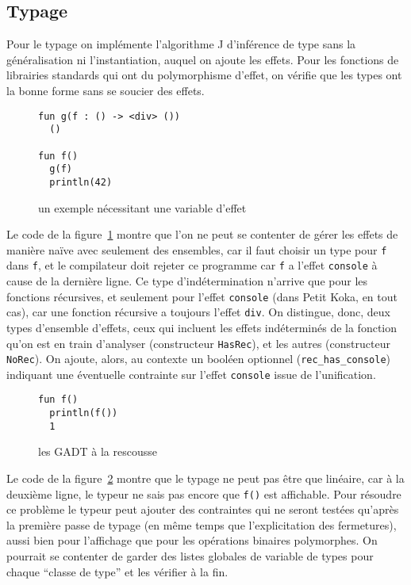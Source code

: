 \documentclass[11pt]{article}
\begin{document}
\subsection{Typage}
Pour le typage on implémente l'algorithme J d'inférence de type sans la
généralisation ni l'instantiation, auquel on ajoute les effets. Pour les
fonctions de librairies standards qui ont du polymorphisme d'effet, on vérifie
que les types ont la bonne forme sans se soucier des effets.

\begin{figure}[h]\label{code2}
\begin{verbatim}
fun g(f : () -> <div> ())
  ()

fun f()
  g(f)
  println(42)
\end{verbatim}
\caption{un exemple nécessitant une variable d'effet}
\end{figure}

Le code de la figure~\ref{code2} montre que l'on ne peut se contenter de gérer
les effets de manière naïve avec seulement des ensembles, car il faut choisir un
type pour \texttt{f} dans \texttt{f}, et le compilateur doit rejeter ce
programme car \texttt{f} a l'effet \texttt{console} à cause de la dernière
ligne. Ce type d'indétermination n'arrive que pour les fonctions récursives, et
seulement pour l'effet \texttt{console} (dans \textsf{Petit Koka}, en tout cas),
car une fonction récursive a toujours l'effet \texttt{div}. On distingue, donc,
deux types d'ensemble d'effets, ceux qui incluent les effets indéterminés de la
fonction qu'on est en train d'analyser (constructeur \texttt{HasRec}), et les
autres (constructeur \texttt{NoRec}). On ajoute, alors, au contexte un booléen
optionnel (\texttt{rec\_has\_console}) indiquant une éventuelle contrainte sur
l'effet \texttt{console} issue de l'unification.

\begin{figure}[h]\label{code1}
\begin{verbatim}
fun f()
  println(f())
  1
\end{verbatim}
\caption{les GADT à la rescousse}
\end{figure}

Le code de la figure~\ref{code1} montre que le typage ne peut pas être que
linéaire, car à la deuxième ligne, le typeur ne sais pas encore que \texttt{f()}
est affichable. Pour résoudre ce problème le typeur peut ajouter des contraintes
qui ne seront testées qu'après la première passe de typage (en même temps que
l'explicitation des fermetures), aussi bien pour l'affichage que pour les
opérations binaires polymorphes. On pourrait se contenter de garder des listes
globales de variable de types pour chaque ``classe de type'' et les vérifier à
la fin.
\end{document}
